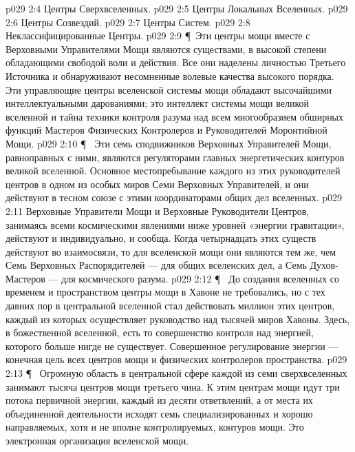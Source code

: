 \vs p029 2:4 \bibnobreakspace Центры Сверхвселенных.
\vs p029 2:5 \bibnobreakspace Центры Локальных Вселенных.
\vs p029 2:6 \bibnobreakspace Центры Созвездий.
\vs p029 2:7 \bibnobreakspace Центры Систем.
\vs p029 2:8 \bibnobreakspace Неклассифицированные Центры.
\vs p029 2:9 \P\ Эти центры мощи вместе с Верховными Управителями Мощи являются существами, в высокой степени обладающими свободой воли и действия. Все они наделены личностью Третьего Источника и обнаруживают несомненные волевые качества высокого порядка. Эти управляющие центры вселенской системы мощи обладают высочайшими интеллектуальными дарованиями; это интеллект системы мощи великой вселенной и тайна техники контроля разума над всем многообразием обширных функций Мастеров Физических Контролеров и Руководителей Моронтийной Мощи.
\vs p029 2:10 \P\ \bibnobreakspace {} Эти семь сподвижников Верховных Управителей Мощи, равноправных с ними, являются регуляторами главных энергетических контуров великой вселенной. Основное местопребывание каждого из этих руководителей центров в одном из особых миров Семи Верховных Управителей, и они действуют в тесном союзе с этими координаторами общих дел вселенных.
\vs p029 2:11 Верховные Управители Мощи и Верховные Руководители Центров, занимаясь всеми космическими явлениями ниже уровней «энергии гравитации», действуют и индивидуально, и сообща. Когда четырнадцать этих существ действуют во взаимосвязи, то для вселенской мощи они являются тем же, чем Семь Верховных Распорядителей --- для общих вселенских дел, а Семь Духов\hyp{}Мастеров --- для космического разума.
\vs p029 2:12 \P\ \bibnobreakspace {} До создания вселенных со временем и пространством центры мощи в Хавоне не требовались, но с тех давних пор в центральной вселенной стал действовать миллион этих центров, каждый из которых осуществляет руководство над тысячей миров Хавоны. Здесь, в божественной вселенной, есть то совершенство контроля над энергией, которого больше нигде не существует. Совершенное регулирование энергии --- конечная цель всех центров мощи и физических контролеров пространства.
\vs p029 2:13 \P\ \bibnobreakspace {} Огромную область в центральной сфере каждой из семи сверхвселенных занимают тысяча центров мощи третьего чина. К этим центрам мощи идут три потока первичной энергии, каждый из десяти ответвлений, а от места их объединенной деятельности исходят семь специализированных и хорошо направляемых, хотя и не вполне контролируемых, контуров мощи. Это электронная организация вселенской мощи.
